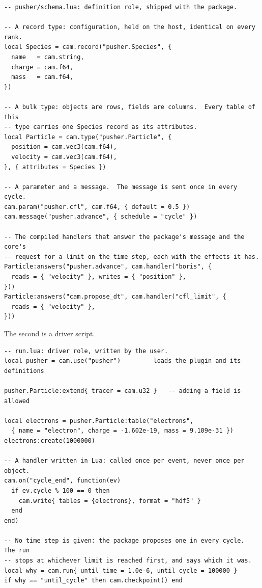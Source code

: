 \documentclass[11pt,a4paper]{article}
\begin{document}
\begin{lstlisting}[language={[5.3]Lua}]
-- pusher/schema.lua: definition role, shipped with the package.

-- A record type: configuration, held on the host, identical on every rank.
local Species = cam.record("pusher.Species", {
  name   = cam.string,
  charge = cam.f64,
  mass   = cam.f64,
})

-- A bulk type: objects are rows, fields are columns.  Every table of this
-- type carries one Species record as its attributes.
local Particle = cam.type("pusher.Particle", {
  position = cam.vec3(cam.f64),
  velocity = cam.vec3(cam.f64),
}, { attributes = Species })

-- A parameter and a message.  The message is sent once in every cycle.
cam.param("pusher.cfl", cam.f64, { default = 0.5 })
cam.message("pusher.advance", { schedule = "cycle" })

-- The compiled handlers that answer the package's message and the core's
-- request for a limit on the time step, each with the effects it has.
Particle:answers("pusher.advance", cam.handler("boris", {
  reads = { "velocity" }, writes = { "position" },
}))
Particle:answers("cam.propose_dt", cam.handler("cfl_limit", {
  reads = { "velocity" },
}))
\end{lstlisting}

The second is a driver script.

\begin{lstlisting}[language={[5.3]Lua}]
-- run.lua: driver role, written by the user.
local pusher = cam.use("pusher")      -- loads the plugin and its definitions

pusher.Particle:extend{ tracer = cam.u32 }   -- adding a field is allowed

local electrons = pusher.Particle:table("electrons",
  { name = "electron", charge = -1.602e-19, mass = 9.109e-31 })
electrons:create(1000000)

-- A handler written in Lua: called once per event, never once per object.
cam.on("cycle_end", function(ev)
  if ev.cycle % 100 == 0 then
    cam.write{ tables = {electrons}, format = "hdf5" }
  end
end)

-- No time step is given: the package proposes one in every cycle.  The run
-- stops at whichever limit is reached first, and says which it was.
local why = cam.run{ until_time = 1.0e-6, until_cycle = 100000 }
if why == "until_cycle" then cam.checkpoint() end
\end{lstlisting}
\end{document}
